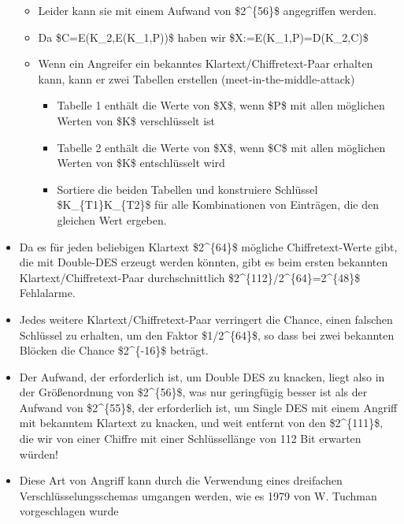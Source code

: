 \documentclass[a4paper]{article}
\begin{document}
\begin{multicols}{3}
\begin{itemize}
              \begin{itemize}
                  \item
                        Leider kann sie mit einem Aufwand von \$2\^{}\{56\}\$ angegriffen
                        werden.
                  \item
                        Da \$C=E(K\_2,E(K\_1,P))\$ haben wir \$X:=E(K\_1,P)=D(K\_2,C)\$
                  \item
                        Wenn ein Angreifer ein bekanntes Klartext/Chiffretext-Paar erhalten
                        kann, kann er zwei Tabellen erstellen (meet-in-the-middle-attack)

                        \begin{itemize}
                            \item
                                  Tabelle 1 enthält die Werte von \$X\$, wenn \$P\$ mit allen
                                  möglichen Werten von \$K\$ verschlüsselt ist
                            \item
                                  Tabelle 2 enthält die Werte von \$X\$, wenn \$C\$ mit allen
                                  möglichen Werten von \$K\$ entschlüsselt wird
                            \item
                                  Sortiere die beiden Tabellen und konstruiere Schlüssel
                                  \$K\_\{T1\}\textbar\textbar K\_\{T2\}\$ für alle Kombinationen von
                                  Einträgen, die den gleichen Wert ergeben.
                        \end{itemize}
              \end{itemize}
        \item
              Da es für jeden beliebigen Klartext \$2\^{}\{64\}\$ mögliche
              Chiffretext-Werte gibt, die mit Double-DES erzeugt werden könnten,
              gibt es beim ersten bekannten Klartext/Chiffretext-Paar
              durchschnittlich \$2\^{}\{112\}/2\^{}\{64\}=2\^{}\{48\}\$ Fehlalarme.
        \item
              Jedes weitere Klartext/Chiffretext-Paar verringert die Chance, einen
              falschen Schlüssel zu erhalten, um den Faktor \$1/2\^{}\{64\}\$, so
              dass bei zwei bekannten Blöcken die Chance \$2\^{}\{-16\}\$ beträgt.
        \item
              Der Aufwand, der erforderlich ist, um Double DES zu knacken, liegt
              also in der Größenordnung von \$2\^{}\{56\}\$, was nur geringfügig
              besser ist als der Aufwand von \$2\^{}\{55\}\$, der erforderlich ist,
              um Single DES mit einem Angriff mit bekanntem Klartext zu knacken, und
              weit entfernt von den \$2\^{}\{111\}\$, die wir von einer Chiffre mit
              einer Schlüssellänge von 112 Bit erwarten würden!
        \item
              Diese Art von Angriff kann durch die Verwendung eines dreifachen
              Verschlüsselungsschemas umgangen werden, wie es 1979 von W. Tuchman
              vorgeschlagen wurde


\end{itemize}
\end{multicols}
\end{document}
